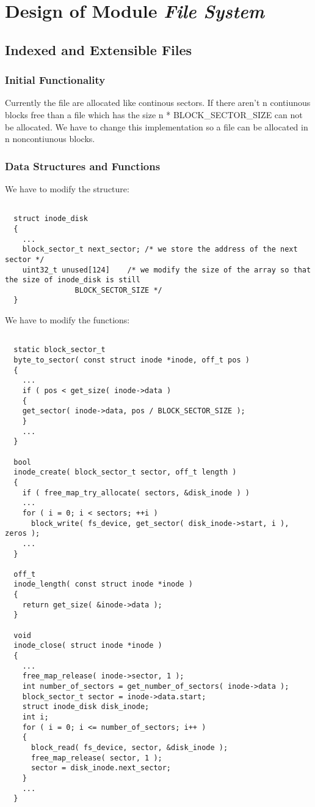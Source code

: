 \chapter{Design of Module \textit{File System}}


\section{Indexed and Extensible Files}
\subsection{Initial Functionality}
  
Currently the file are allocated like continous sectors. If there aren't n contiunous blocks free than a 
file which has the size n * BLOCK\_SECTOR\_SIZE can not be allocated. We have to change this implementation
so a file can be allocated in n noncontiunous blocks.

\subsection{Data Structures and Functions}

We have to modify the structure:

\begin{lstlisting}

  struct inode_disk
  {
    ...
    block_sector_t next_sector; /* we store the address of the next sector */
    uint32_t unused[124]	/* we modify the size of the array so that the size of inode_disk is still 
				BLOCK_SECTOR_SIZE */
  }

\end{lstlisting}

We have to modify the functions:
\begin{lstlisting}
 
  static block_sector_t
  byte_to_sector( const struct inode *inode, off_t pos )
  {
    ...
    if ( pos < get_size( inode->data )
    {
	get_sector( inode->data, pos / BLOCK_SECTOR_SIZE ); 
    }
    ...
  }

  bool
  inode_create( block_sector_t sector, off_t length )
  {
    if ( free_map_try_allocate( sectors, &disk_inode ) )
    ...
    for ( i = 0; i < sectors; ++i )
      block_write( fs_device, get_sector( disk_inode->start, i ), zeros );
    ...
  }

  off_t
  inode_length( const struct inode *inode )
  {
    return get_size( &inode->data );
  }

  void
  inode_close( struct inode *inode )
  {
    ...
    free_map_release( inode->sector, 1 );
    int number_of_sectors = get_number_of_sectors( inode->data );
    block_sector_t sector = inode->data.start;
    struct inode_disk disk_inode;
    int i;
    for ( i = 0; i <= number_of_sectors; i++ )
    {
      block_read( fs_device, sector, &disk_inode );
      free_map_release( sector, 1 );
      sector = disk_inode.next_sector;
    }
    ...
  }

\end{lstlisting}


